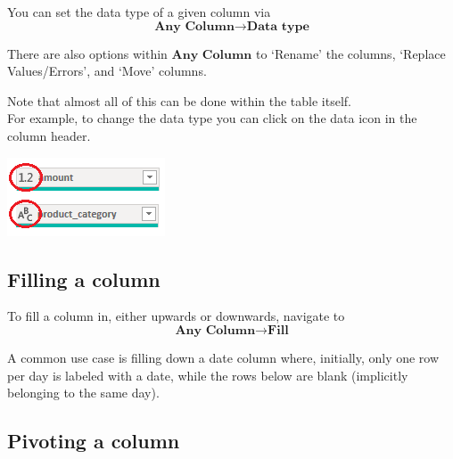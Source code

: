\documentclass[10pt, openany, twocolumn]{book}
\begin{document}
You can set the data type of a given column via 
$$\textbf{Any Column} \rightarrow \textbf{Data type}$$

There are also options within $\textbf{Any Column}$ to `Rename' the columns, `Replace Values/Errors', and `Move' columns. 

\begin{tcolorbox}[colback=yellow!2!white, colframe=yellow!60!gray]
Note that almost all of this can be done within the table itself. \\

For example, to change the data type you can click on the data icon in the column header.
\begin{center}
    \includegraphics[width = 0.5\columnwidth]{images/change_type.png}
\end{center}
\end{tcolorbox}

\subsection*{Filling a column}

To fill a column in, either upwards or downwards, navigate to 
$$\textbf{Any Column} \rightarrow \textbf{Fill}$$

A common use case is filling down a date column where, initially, only one row per day is labeled with a date, while the rows below are blank (implicitly belonging to the same day).

\subsection*{Pivoting a column}
\end{document}
